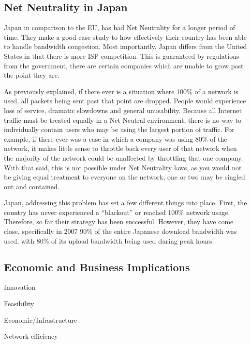 \documentclass{sigcomm-alternate}
\begin{document}
\subsection{Net Neutrality in Japan}

Japan in comparison to the EU, has had Net Neutrality for a longer period of time.  They make a good case study to how effectively their country has been able to handle bandwidth congestion.  Most importantly, Japan differs from the United States in that there is more ISP competition.  This is guaranteed by regulations from the government, there are certain companies which are unable to grow past the point they are.

As previously explained, if there ever is a situation where 100\% of a network is used, all packets being sent past that point are dropped.  People would experience loss of service, dramatic slowdowns and general unusability.  Because all Internet traffic must be treated equally in a Net Neutral environment, there is no way to individually contain users who may be using the largest portion of traffic.  For example, if there ever was a case in which a company was using 80\% of the network, it makes little sense to throttle back every user of that network when the majority of the network could be unaffected by throttling that one company.  With that said, this is not possible under Net Neutrality laws, as you would not be giving equal treatment to everyone on the network, one or two may be singled out and contained.

Japan, addressing this problem has set a few different things into place.  First, the country has never experienced a “blackout” or reached 100\% network usage.  Therefore, so far their strategy has been successful.  However, they have come close, specifically in 2007 90\% of the entire Japanese download bandwidth was used, with 80\% of its upload bandwidth being used during peak hours.  

\subsection{Economic and Business Implications}


Innovation

Feasibility

Economic/Infrastructure

Network efficiency




\end{document}
